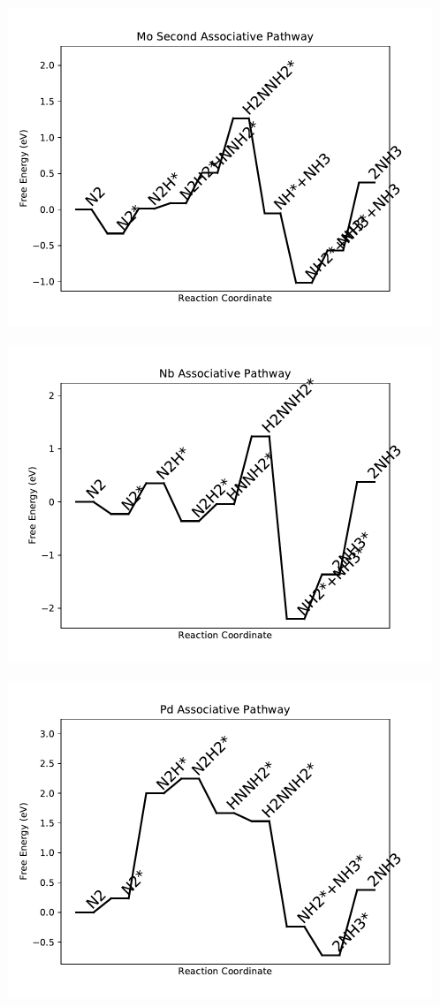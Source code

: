 \begin{figure}
\centering
\includegraphics[width=0.8\linewidth]{data/plots/Mo_associative_2.pdf}
\end{figure}

\begin{figure}
\centering
\includegraphics[width=0.8\linewidth]{data/plots/Nb_associative.pdf}
\end{figure}

\begin{figure}
\centering
\includegraphics[width=0.8\linewidth]{data/plots/Pd_associative.pdf}
\end{figure}

